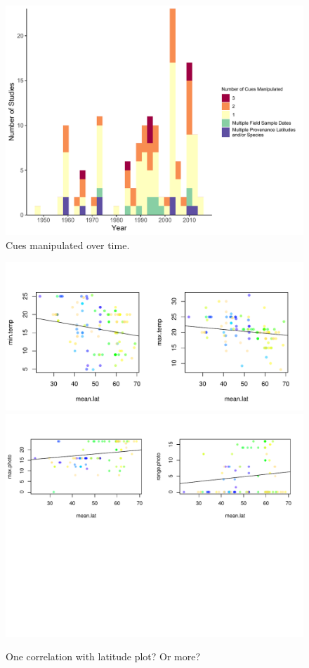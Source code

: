 \documentclass[11pt,letter]{article}
\begin{document}
\begin{figure}[t!]
\centering
\includegraphics[width=1\textwidth]{..//..//analyses/limitingcues/figures/studyyearcues.pdf}
\caption{Cues manipulated over time.}
  \label{fig:ts}
\end{figure}
\clearpage

\begin{figure}[t!]
\centering
\includegraphics[width=1\textwidth]{..//..//analyses/limitingcues/figures/tempxlatminmaxcorr.pdf}
\includegraphics[width=1\textwidth]{..//..//analyses/limitingcues/figures/photoxlatcorr2plots.pdf}
\caption{One correlation with latitude plot? Or more?}
  \label{fig:lat}
\end{figure}
\clearpage
\end{document}
